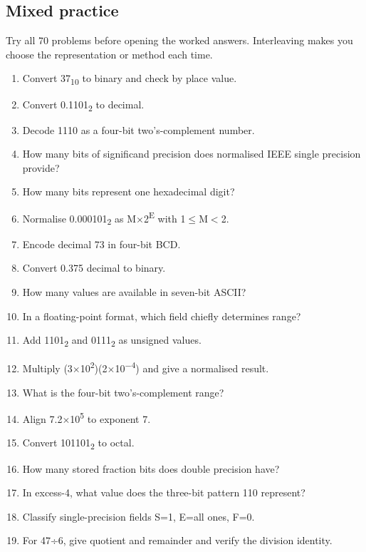 \documentclass[11pt]{article}
\begin{document}
\begin{keepsection}
\section{Mixed practice}

Try all 70 problems before opening the worked answers. Interleaving makes you choose the representation or method each time.

\begin{enumerate}
\item Convert 37\textsubscript{10} to binary and check by place value.
\item Convert 0.1101\textsubscript{2} to decimal.
\item Decode 1110 as a four-bit two’s-complement number.
\item How many bits of significand precision does normalised IEEE single precision provide?
\item How many bits represent one hexadecimal digit?
\item Normalise 0.000101\textsubscript{2} as M\ensuremath{\times}2\textsuperscript{E} with 1\ensuremath{\leq}M\ensuremath{<}2.
\item Encode decimal 73 in four-bit BCD.
\item Convert 0.375 decimal to binary.
\item How many values are available in seven-bit ASCII?
\item In a floating-point format, which field chiefly determines range?
\item Add 1101\textsubscript{2} and 0111\textsubscript{2} as unsigned values.
\item Multiply (3\ensuremath{\times}10\textsuperscript{2})(2\ensuremath{\times}10\textsuperscript{\ensuremath{-}4}) and give a normalised result.
\item What is the four-bit two’s-complement range?
\item Align 7.2\ensuremath{\times}10\textsuperscript{5} to exponent 7.
\item Convert 101101\textsubscript{2} to octal.
\item How many stored fraction bits does double precision have?
\item In excess-4, what value does the three-bit pattern 110 represent?
\item Classify single-precision fields S=1, E=all ones, F=0.
\item For 47÷6, give quotient and remainder and verify the division identity.

\end{enumerate}
\end{keepsection}
\end{document}
